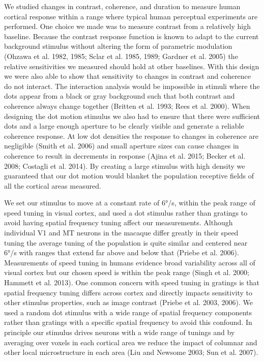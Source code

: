 \documentclass{report}
\begin{document}
We studied changes in contrast, coherence, and duration to measure human cortical response within a range where typical human perceptual experiments are performed. One choice we made was to measure contrast from a relatively high baseline. Because the contrast response function is known to adapt to the current background stimulus without altering the form of parametric modulation (Ohzawa et al. 1982, 1985; Sclar et al. 1985, 1989; Gardner et al. 2005) the relative sensitivities we measured should hold at other baselines. With this design we were also able to show that sensitivity to changes in contrast and coherence do not interact. The interaction analysis would be impossible in stimuli where the dots appear from a black or gray background such that both contrast and coherence always change together (Britten et al. 1993; Rees et al. 2000). When designing the dot motion stimulus we also had to ensure that there were sufficient dots and a large enough aperture to be clearly visible and generate a reliable coherence response. At low dot densities the response to changes in coherence are negligible (Smith et al. 2006) and small aperture sizes can cause changes in coherence to result in decrements in response (Ajina et al. 2015; Becker et al. 2008; Costagli et al. 2014). By creating a large stimulus with high density we guaranteed that our dot motion would blanket the population receptive fields of all the cortical areas measured.

We set our stimulus to move at a constant rate of 6°/s, within the peak range of speed tuning in visual cortex, and used a dot stimulus rather than gratings to avoid having spatial frequency tuning affect our measurements. Although individual V1 and MT neurons in the macaque differ greatly in their speed tuning the average tuning of the population is quite similar and centered near 6°/s with ranges that extend far above and below that (Priebe et al. 2006). Measurements of speed tuning in humans evidence broad variability across all of visual cortex but our chosen speed is within the peak range (Singh et al. 2000; Hammett et al. 2013). One common concern with speed tuning in gratings is that spatial frequency tuning differs across cortex and directly impacts sensitivity to other stimulus properties, such as image contrast (Priebe et al. 2003, 2006). We used a random dot stimulus with a wide range of spatial frequency components rather than gratings with a specific spatial frequency to avoid this confound. In principle our stimulus drives neurons with a wide range of tunings and by averaging over voxels in each cortical area we reduce the impact of columnar and other local microstructure in each area (Liu and Newsome 2003; Sun et al. 2007).
\end{document}
